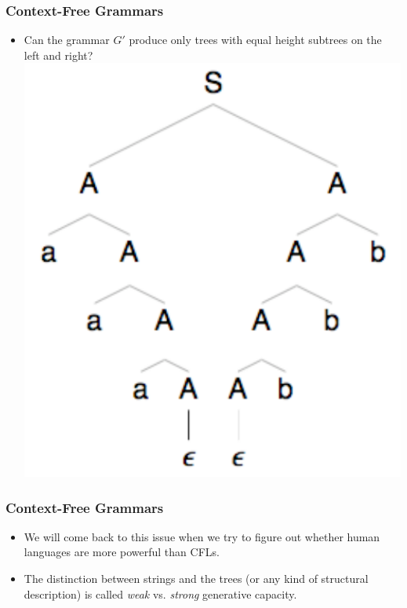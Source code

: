 \begin{frame}
\frametitle{Context-Free Grammars}
\begin{itemize}
\item Can the grammar $G'$ produce only trees with equal height subtrees on the left and right? \\
\includegraphics[scale=0.5]{figures/cfg1}
\end{itemize}

\end{frame}

\begin{frame}
\frametitle{Context-Free Grammars}
\begin{itemize}
\item We will come back to this issue when we try to figure out whether human languages are more powerful than CFLs. 
\item The distinction between strings and the trees (or any kind of structural description) is called {\em weak} vs. {\em strong} generative capacity.
\end{itemize}

\end{frame}

